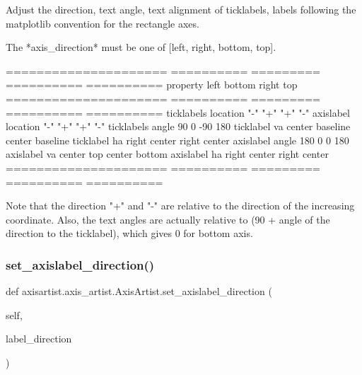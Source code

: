 \begin{DoxyVerb}Adjust the direction, text angle, text alignment of
ticklabels, labels following the matplotlib convention for
the rectangle axes.

The *axis_direction* must be one of [left, right, bottom, top].

=====================    ========== ========= ========== ==========
property                 left       bottom    right      top
=====================    ========== ========= ========== ==========
ticklabels location      "-"        "+"       "+"        "-"
axislabel location       "-"        "+"       "+"        "-"
ticklabels angle         90         0         -90        180
ticklabel va             center     baseline  center     baseline
ticklabel ha             right      center    right      center
axislabel angle          180        0         0          180
axislabel va             center     top       center     bottom
axislabel ha             right      center    right      center
=====================    ========== ========= ========== ==========

Note that the direction "+" and "-" are relative to the direction of
the increasing coordinate. Also, the text angles are actually
relative to (90 + angle of the direction to the ticklabel),
which gives 0 for bottom axis.
\end{DoxyVerb}
 \mbox{\label{classaxisartist_1_1axis__artist_1_1AxisArtist_a2a300caa979172948ba691317616160d}} 
\subsubsection{\texorpdfstring{set\+\_\+axislabel\+\_\+direction()}{set\_axislabel\_direction()}}
{\footnotesize\ttfamily def axisartist.\+axis\+\_\+artist.\+Axis\+Artist.\+set\+\_\+axislabel\+\_\+direction (\begin{DoxyParamCaption}\item[{}]{self,  }\item[{}]{label\+\_\+direction }\end{DoxyParamCaption})}

